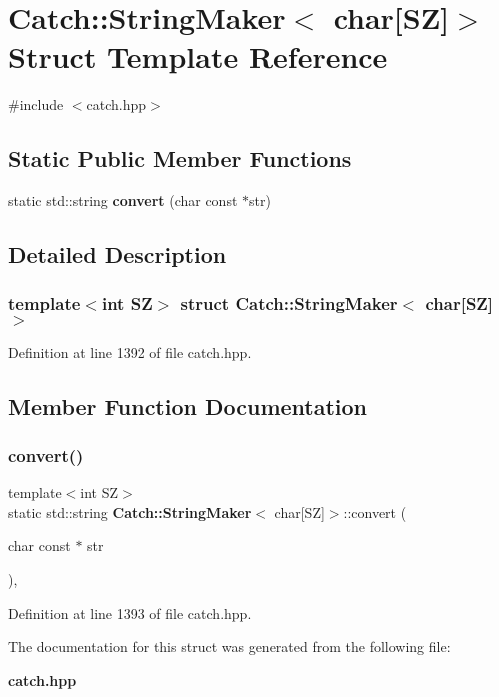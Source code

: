 \section{Catch\+::String\+Maker$<$ char[SZ]$>$ Struct Template Reference}
\label{struct_catch_1_1_string_maker_3_01char[_s_z]_4}


{\ttfamily \#include $<$catch.\+hpp$>$}

\subsection*{Static Public Member Functions}
\begin{DoxyCompactItemize}
\item 
static std\+::string \textbf{ convert} (char const $\ast$str)
\end{DoxyCompactItemize}


\subsection{Detailed Description}
\subsubsection*{template$<$int SZ$>$\newline
struct Catch\+::\+String\+Maker$<$ char[\+S\+Z]$>$}



Definition at line 1392 of file catch.\+hpp.



\subsection{Member Function Documentation}
\mbox{\label{struct_catch_1_1_string_maker_3_01char[_s_z]_4_a095e415534f9145300271befe9853357}} 
\subsubsection{convert()}
{\footnotesize\ttfamily template$<$int SZ$>$ \\
static std\+::string \textbf{ Catch\+::\+String\+Maker}$<$ char[SZ]$>$\+::convert (\begin{DoxyParamCaption}\item[{char const $\ast$}]{str }\end{DoxyParamCaption})\hspace{0.3cm}{\ttfamily [inline]}, {\ttfamily [static]}}



Definition at line 1393 of file catch.\+hpp.



The documentation for this struct was generated from the following file\+:\begin{DoxyCompactItemize}
\item 
\textbf{ catch.\+hpp}\end{DoxyCompactItemize}
